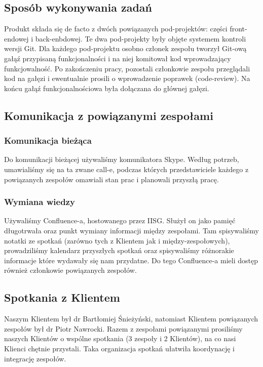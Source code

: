 \documentclass[polish,12pt]{aghthesis}
\begin{document}
\subsection{Sposób wykonywania zadań}
Produkt składa się de facto z dwóch powiązanych pod-projektów: części front-endowej i back-enbdowej. Te dwa pod-projekty były objęte systemem kontroli wersji Git. Dla każdego pod-projektu osobno członek zespołu tworzył Git-ową gałąź przypisaną funkcjonalności i na niej komitował kod wprowadzający funkcjowalność. Po zakończeniu pracy, pozostali członkowie zespołu przeglądali kod na gałęzi i ewentualnie prosili o wprowadzenie poprawek (code-review). Na końcu gałąź funkcjonalnościowa była dołączana do głównej gałęzi.

\subsection{Komunikacja z powiązanymi zespołami}
\subsubsection{Komunikacja bieżąca}
Do komunikacji bieżącej używaliśmy komunikatora Skype. Według potrzeb, umawialiśmy się na ta zwane call-e, podczas których przedstawiciele każdego z powiązanych zespołów omawiali stan prac i planowali przyszłą pracę.
\subsubsection{Wymiana wiedzy}
Używaliśmy Confluence-a, hostowanego przez IISG. Służył on jako pamięć długotrwała oraz punkt wymiany informacji między zespołami. Tam spisywaliśmy notatki ze spotkań (zarówno tych z Klientem jak i między-zespołowych), prowadziliśmy kalendarz przyszłych spotkań oraz spisywaliśmy różnorakie informacje które wydawały się nam przydatne. Do tego Confluence-a mieli dostęp również członkowie powiązanych zespołów.

\subsection{Spotkania z Klientem}
Naszym Klientem był dr Bartłomiej Śnieżyński, natomiast Klientem powiązanych zespołów był dr Piotr Nawrocki. Razem z zespołami powiązanymi prosiliśmy naszych Klientów o wspólne spotkania (3 zespoły i 2 Klientów), na co nasi Klienci chętnie przystali. Taka organizacja spotkań ułatwiła koordynację i integrację zespołów.
  
\end{document}

